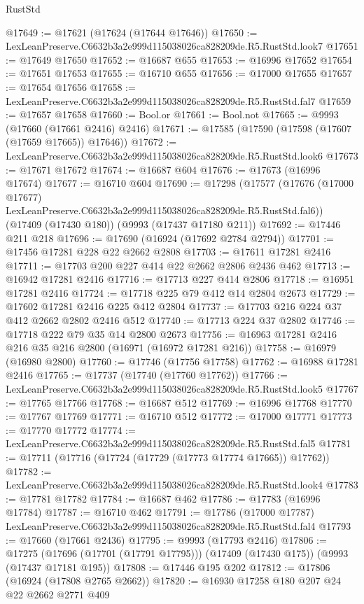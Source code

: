 \begin{lexlean}{RustStd}
\begin{coremodule}
@17649 := @17621 (@17624 (@17644 @17646))
@17650 := LexLeanPreserve.C6632b3a2e999d115038026ca828209de.R5.RustStd.look7
@17651 := @17649 @17650
@17652 := @16687 @655
@17653 := @16996 @17652
@17654 := @17651 @17653
@17655 := @16710 @655
@17656 := @17000 @17655
@17657 := @17654 @17656
@17658 := LexLeanPreserve.C6632b3a2e999d115038026ca828209de.R5.RustStd.fal7
@17659 := @17657 @17658
@17660 := Bool.or
@17661 := Bool.not
@17665 := @9993 (@17660 (@17661 @2416) @2416)
@17671 := @17585 (@17590 (@17598 (@17607 (@17659 @17665)) @17646))
@17672 := LexLeanPreserve.C6632b3a2e999d115038026ca828209de.R5.RustStd.look6
@17673 := @17671 @17672
@17674 := @16687 @604
@17676 := @17673 (@16996 @17674)
@17677 := @16710 @604
@17690 := @17298
    (@17577
      (@17676 (@17000 @17677) LexLeanPreserve.C6632b3a2e999d115038026ca828209de.R5.RustStd.fal6))
    (@17409 (@17430 @180))
    (@9993 (@17437 @17180 @211))
@17692 := @17446 @211 @218
@17696 := @17690 (@16924 (@17692 @2784 @2794))
@17701 := @17456 @17281 @228 @22 @2662 @2808
@17703 := @17611 @17281 @2416
@17711 := @17703 @200 @227 @414 @22 @2662 @2806 @2436 @462
@17713 := @16942 @17281 @2416
@17716 := @17713 @227 @414 @2806
@17718 := @16951 @17281 @2416
@17724 := @17718 @225 @79 @412 @14 @2804 @2673
@17729 := @17602 @17281 @2416 @225 @412 @2804
@17737 := @17703 @216 @224 @37 @412 @2662 @2802 @2416 @512
@17740 := @17713 @224 @37 @2802
@17746 := @17718 @222 @79 @35 @14 @2800 @2673
@17756 := @16963 @17281 @2416 @216 @35 @216 @2800 (@16971 (@16972 @17281 @216))
@17758 := @16979 (@16980 @2800)
@17760 := @17746 (@17756 @17758)
@17762 := @16988 @17281 @2416
@17765 := @17737 (@17740 (@17760 @17762))
@17766 := LexLeanPreserve.C6632b3a2e999d115038026ca828209de.R5.RustStd.look5
@17767 := @17765 @17766
@17768 := @16687 @512
@17769 := @16996 @17768
@17770 := @17767 @17769
@17771 := @16710 @512
@17772 := @17000 @17771
@17773 := @17770 @17772
@17774 := LexLeanPreserve.C6632b3a2e999d115038026ca828209de.R5.RustStd.fal5
@17781 := @17711 (@17716 (@17724 (@17729 (@17773 @17774 @17665)) @17762))
@17782 := LexLeanPreserve.C6632b3a2e999d115038026ca828209de.R5.RustStd.look4
@17783 := @17781 @17782
@17784 := @16687 @462
@17786 := @17783 (@16996 @17784)
@17787 := @16710 @462
@17791 := @17786 (@17000 @17787) LexLeanPreserve.C6632b3a2e999d115038026ca828209de.R5.RustStd.fal4
@17793 := @17660 (@17661 @2436)
@17795 := @9993 (@17793 @2416)
@17806 := @17275
    (@17696 (@17701 (@17791 @17795)))
    (@17409 (@17430 @175))
    (@9993 (@17437 @17181 @195))
@17808 := @17446 @195 @202
@17812 := @17806 (@16924 (@17808 @2765 @2662))
@17820 := @16930 @17258 @180 @207 @24 @22 @2662 @2771 @409

\end{coremodule}
\end{lexlean}
